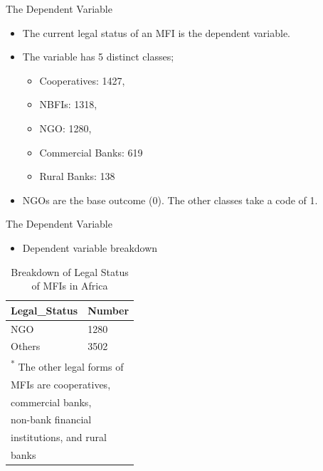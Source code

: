 \documentclass[
  ignorenonframetext,
]{beamer}
\providecommand{\tightlist}{%
  \setlength{\itemsep}{0pt}\setlength{\parskip}{0pt}}
\begin{document}
\begin{frame}{The Dependent Variable}
\protect\hypertarget{the-dependent-variable}{}
\begin{itemize}
\item
  The current legal status of an MFI is the dependent variable.
\item
  The variable has 5 distinct classes;

  \begin{itemize}
  \tightlist
  \item
    Cooperatives: 1427,
  \item
    NBFIs: 1318,
  \item
    NGO: 1280,
  \item
    Commercial Banks: 619
  \item
    Rural Banks: 138
  \end{itemize}
\item
  NGOs are the base outcome (0). The other classes take a code of 1.
\end{itemize}
\end{frame}

\begin{frame}{The Dependent Variable}
\protect\hypertarget{the-dependent-variable-1}{}
\begin{itemize}
\tightlist
\item
  Dependent variable breakdown
\end{itemize}

\begin{table}

\caption{\label{tab:unnamed-chunk-1}Breakdown of Legal Status of MFIs in Africa}
\centering
\begin{tabular}[t]{ll}
\toprule
Legal\_Status & Number\\
\midrule
NGO & 1280\\
Others & 3502\\
\bottomrule
\multicolumn{2}{l}{\textsuperscript{*} The other legal forms of}\\
\multicolumn{2}{l}{MFIs are cooperatives,}\\
\multicolumn{2}{l}{commercial banks,}\\
\multicolumn{2}{l}{non-bank financial}\\
\multicolumn{2}{l}{institutions, and rural}\\
\multicolumn{2}{l}{banks}\\
\end{tabular}
\end{table}
\end{frame}
\end{document}
